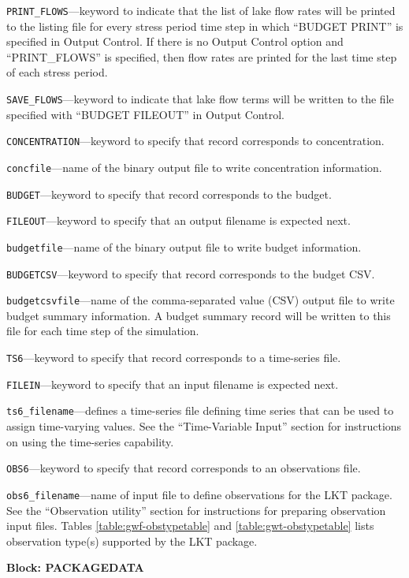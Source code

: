 \begin{description}
\item \texttt{PRINT\_FLOWS}---keyword to indicate that the list of lake flow rates will be printed to the listing file for every stress period time step in which ``BUDGET PRINT'' is specified in Output Control.  If there is no Output Control option and ``PRINT\_FLOWS'' is specified, then flow rates are printed for the last time step of each stress period.

\item \texttt{SAVE\_FLOWS}---keyword to indicate that lake flow terms will be written to the file specified with ``BUDGET FILEOUT'' in Output Control.

\item \texttt{CONCENTRATION}---keyword to specify that record corresponds to concentration.

\item \texttt{concfile}---name of the binary output file to write concentration information.

\item \texttt{BUDGET}---keyword to specify that record corresponds to the budget.

\item \texttt{FILEOUT}---keyword to specify that an output filename is expected next.

\item \texttt{budgetfile}---name of the binary output file to write budget information.

\item \texttt{BUDGETCSV}---keyword to specify that record corresponds to the budget CSV.

\item \texttt{budgetcsvfile}---name of the comma-separated value (CSV) output file to write budget summary information.  A budget summary record will be written to this file for each time step of the simulation.

\item \texttt{TS6}---keyword to specify that record corresponds to a time-series file.

\item \texttt{FILEIN}---keyword to specify that an input filename is expected next.

\item \texttt{ts6\_filename}---defines a time-series file defining time series that can be used to assign time-varying values. See the ``Time-Variable Input'' section for instructions on using the time-series capability.

\item \texttt{OBS6}---keyword to specify that record corresponds to an observations file.

\item \texttt{obs6\_filename}---name of input file to define observations for the LKT package. See the ``Observation utility'' section for instructions for preparing observation input files. Tables \ref{table:gwf-obstypetable} and \ref{table:gwt-obstypetable} lists observation type(s) supported by the LKT package.

\end{description}
\item \textbf{Block: PACKAGEDATA}

